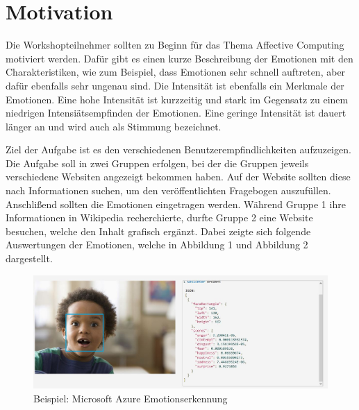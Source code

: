 \section{Motivation}

\label{Einleitung}

Die Workshopteilnehmer sollten zu Beginn für das Thema Affective Computing motiviert werden. Dafür gibt es einen kurze Beschreibung der Emotionen mit den Charakteristiken, wie zum Beispiel, dass Emotionen sehr schnell auftreten, aber dafür ebenfalls sehr ungenau sind. Die Intensität ist ebenfalls ein Merkmale der Emotionen. Eine hohe Intensität ist kurzzeitig und stark im Gegensatz zu einem niedrigen Intensiätsempfinden der Emotionen. Eine geringe Intensität ist dauert länger an und wird auch als Stimmung bezeichnet. 

\label{Workshop Aufgabe}

Ziel der Aufgabe ist es den verschiedenen Benutzerempfindlichkeiten aufzuzeigen. Die Aufgabe soll in zwei Gruppen erfolgen, bei der die Gruppen jeweils verschiedene Websiten angezeigt bekommen haben. Auf der Website sollten diese nach Informationen suchen, um den veröffentlichten Fragebogen auszufüllen. Anschlißend sollten die Emotionen eingetragen werden. Während Gruppe 1 ihre Informationen in Wikipedia recherchierte, durfte Gruppe 2 eine Website besuchen, welche den Inhalt grafisch ergänzt. Dabei zeigte sich folgende Auswertungen der Emotionen, welche in Abbildung 1 und Abbildung 2 dargestellt.

\begin{figure}[!h]
	\centering
	\includegraphics[width=0.9\linewidth]{Pictures/Microsoft_Gestenerkennung}
	\caption[Beispiel: Microsoft Azure Emotionserkennung]{Beispiel: Microsoft Azure Emotionserkennung \cite{MicrosoftAzure}}
	\label{fig:microsoftgestenerkennung}
\end{figure}
